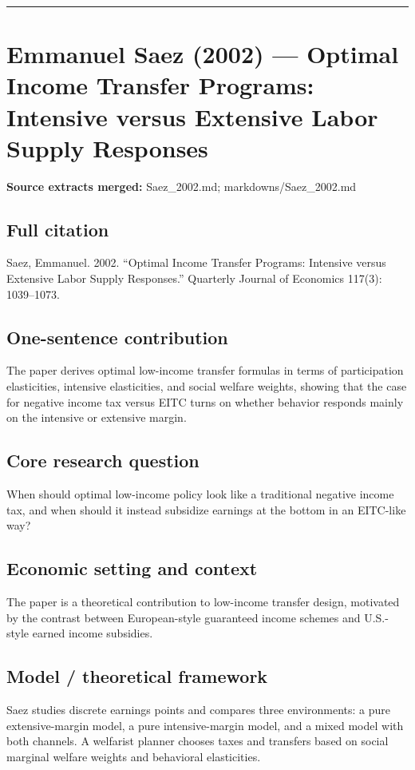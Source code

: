 \documentclass[11pt,a4paper]{article}
\begin{document}
\medskip\hrule\medskip

\section*{Emmanuel Saez (2002) — Optimal Income Transfer Programs: Intensive versus Extensive Labor Supply Responses}

\textbf{Source extracts merged:} Saez\_2002.md; markdowns/Saez\_2002.md

\subsection*{Full citation}
Saez, Emmanuel. 2002. “Optimal Income Transfer Programs: Intensive versus Extensive Labor Supply Responses.” Quarterly Journal of Economics 117(3): 1039–1073.

\subsection*{One-sentence contribution}
The paper derives optimal low-income transfer formulas in terms of participation elasticities, intensive elasticities, and social welfare weights, showing that the case for negative income tax versus EITC turns on whether behavior responds mainly on the intensive or extensive margin.

\subsection*{Core research question}
When should optimal low-income policy look like a traditional negative income tax, and when should it instead subsidize earnings at the bottom in an EITC-like way?

\subsection*{Economic setting and context}
The paper is a theoretical contribution to low-income transfer design, motivated by the contrast between European-style guaranteed income schemes and U.S.-style earned income subsidies.

\subsection*{Model / theoretical framework}
Saez studies discrete earnings points and compares three environments: a pure extensive-margin model, a pure intensive-margin model, and a mixed model with both channels. A welfarist planner chooses taxes and transfers based on social marginal welfare weights and behavioral elasticities.
\end{document}
